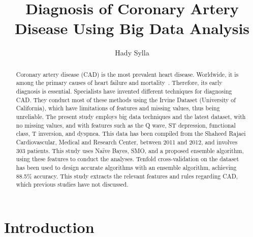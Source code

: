 \title{Diagnosis of Coronary Artery Disease Using Big Data Analysis}

\author{Hady Sylla}



\begin{abstract}
  Coronary artery disease (CAD) is the most prevalent heart disease.
  Worldwide, it is among the primary causes of heart failure and
  mortality~\cite{ali}. Therefore, its early diagnosis is essential.
  Specialists have invented different techniques for diagnosing CAD.
  They conduct most of these methods using the Irvine Dataset
  (University of California), which have limitations of features and
  missing values, thus being unreliable. The present study employs big
  data techniques and the latest dataset, with no missing values, and
  with features such as the Q wave, ST depression, functional class, T
  inversion, and dyspnea. This data has been compiled from the Shaheed
  Rajaei Cardiovascular, Medical and Research Center, between 2011 and
  2012, and involves 303 patients. This study uses Naïve Bayes, SMO,
  and a proposed ensemble algorithm, using these features to conduct
  the analyses. Tenfold cross-validation on the dataset has been used
  to design accurate algorithms with an ensemble algorithm, achieving
  88.5\% accuracy. This study extracts the relevant features and rules
  regarding CAD, which previous studies have not discussed.

\end{abstract}


\maketitle

\section{Introduction}

